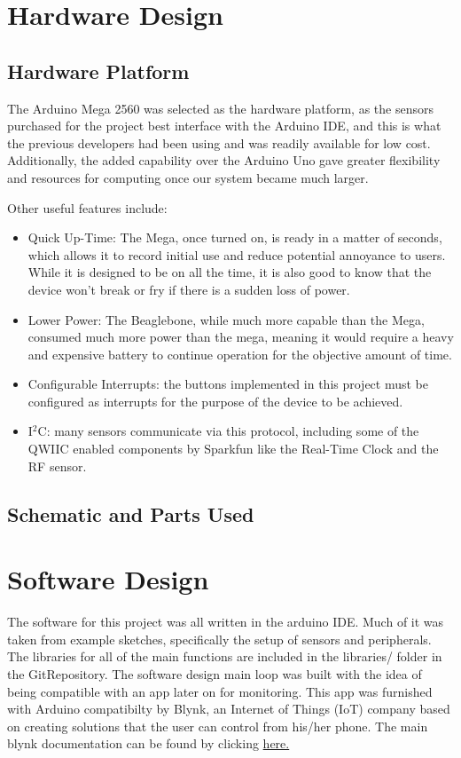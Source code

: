 \documentclass{article}
\begin{document}
\section{Hardware Design}

\subsection{Hardware Platform}
The Arduino Mega 2560 was selected as the hardware platform, as the sensors purchased for the project best interface with the Arduino IDE, and this is what the previous developers had been using and was readily available for low cost. Additionally, the added capability over the Arduino Uno gave greater flexibility and resources for computing once our system became much larger.  

Other useful features include: 
\begin{itemize}
	\item Quick Up-Time: The Mega, once turned on, is ready in a matter of seconds, which allows it to record initial use and reduce potential annoyance to users. While it is designed to be on all the time, it is also good to know that the device won't break or fry if there is a sudden loss of power. 
	\item Lower Power: The Beaglebone, while much more capable than the Mega, consumed much more power than the mega, meaning it would require a heavy and expensive battery to continue operation for the objective amount of time. 
	\item Configurable Interrupts: the buttons implemented in this project must be configured as interrupts for the purpose of the device to be achieved. 
	\item I$^2$C: many sensors communicate via this protocol, including some of the QWIIC enabled components by Sparkfun like the Real-Time Clock and the RF sensor. 
\end{itemize}

\subsection{Schematic and Parts Used}

\section{Software Design}
The software for this project was all written in the arduino IDE. Much of it was taken from example sketches, specifically the setup of sensors and peripherals. The libraries for all of the main functions are included in the libraries/ folder in the GitRepository. The software design main loop was built with the idea of being compatible with an app later on for monitoring. This app was furnished with Arduino compatibilty by Blynk, an Internet of Things (IoT) company based on creating solutions that the user can control from his/her phone. The main blynk documentation can be found by clicking \href{https://docs.blynk.cc/}{here.}
\end{document}
